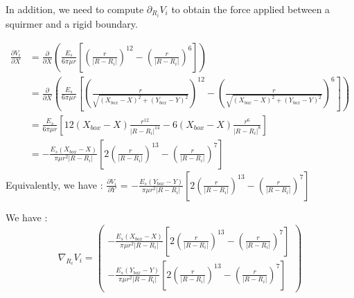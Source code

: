 \documentclass{article}
\begin{document}
\vspace{0,5cm}

In addition, we need to compute $\partial_{R_i} V_i$ to obtain the force applied between a squirmer and a rigid boundary.

\begin{align*}
    \frac{\partial V_i}{\partial X} &= \frac{\partial}{\partial X} \left( \frac{E_s}{6\pi\mu r} \left[ \left( \frac{r}{\lvert R - R_i \rvert} \right)^{12} - \left( \frac{r}{\lvert R - R_i \rvert} \right) ^6 \right] \right) \\
    &= \frac{\partial}{\partial X} \left( \frac{E_s}{6\pi\mu r} \left[ \left( \frac{r}{\sqrt{( X_{box}-X)^2 + (Y_{box}-Y)^2}} \right)^{12} - \left( \frac{r}{\sqrt{( X_{box}-X)^2 + (Y_{box}-Y)^2}} \right) ^6 \right] \right) \\
    &= \frac{E_s}{6\pi\mu r}\left[ 12(X_{box}-X)\frac{r^{12}}{\lvert R - R_i\rvert^{14}} - 6(X_{box}-X)\frac{r^6}{\lvert R-R_i\rvert^8} \right] \\
    &= -\frac{E_s (X_{box}-X)}{\pi\mu r^2 \lvert R - R_i \rvert } \left[ 2 \left( \frac{r}{\lvert R-R_i\rvert} \right)^{13} - \left( \frac{r}{\lvert R-R_i\rvert}\right)^7 \right] 
\end{align*}
Equivalently, we have : $\frac{\partial V_i}{\partial Y}$ = $ - \frac{E_s (Y_{box}-Y)}{\pi\mu r^2 \lvert R - R_i \rvert } \left[ 2 \left( \frac{r}{\lvert R-R_i\rvert} \right)^{13} - \left( \frac{r}{\lvert R-R_i\rvert}\right)^7 \right]$

We have : 
\begin{equation*}
    \boxed{\nabla_{R_i} V_i = \begin{pmatrix}
        - \frac{E_s (X_{box}-X)}{\pi\mu r^2 \lvert R - R_i \rvert } \left[ 2 \left( \frac{r}{\lvert R-R_i\rvert} \right)^{13} - \left( \frac{r}{\lvert R-R_i\rvert}\right)^7 \right] \\
        - \frac{E_s (Y_{box}-Y)}{\pi\mu r^2 \lvert R - R_i \rvert } \left[ 2 \left( \frac{r}{\lvert R-R_i\rvert} \right)^{13} - \left( \frac{r}{\lvert R-R_i\rvert}\right)^7 \right]
    \end{pmatrix}}
\end{equation*}
\end{document}
